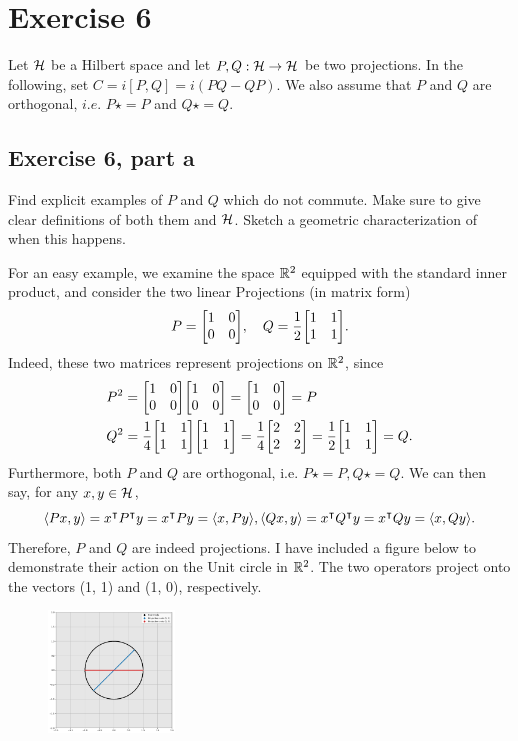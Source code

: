 \newpage
\section{Exercise 6}
Let $\mathcal{H}$ be a Hilbert space and let $P, Q: \mathcal{H} \to \mathcal{H}$ be two projections. In the following, set $C = i[P, Q] = i(PQ - QP)$. We also assume that $P$ and $Q$ are orthogonal, $i.e.$ $P\star = P$ and $Q\star = Q$.
\subsection{Exercise 6, part a}
Find explicit examples of $P$ and $Q$ which do not commute. Make sure to give clear definitions of both them and $\mathcal{H}$. Sketch a geometric characterization of when this happens. 
\partbreak
\begin{solution}

    For an easy example, we examine the space $\mathbb{R}^2$ equipped with the standard inner product, and consider the two linear Projections (in matrix form)
    \[P = \mqty[1&0\\0&0], \quad Q = \frac{1}{2}\mqty[1&1\\1&1].\]
    Indeed, these two matrices represent projections on $\mathbb{R}^2$, since 
    \begin{align*}
        &P^2 = \mqty[1&0\\0&0]\mqty[1&0\\0&0] = \mqty[1&0\\0&0] = P\\
        &Q^2 = \frac{1}{4}\mqty[1&1\\1&1]\mqty[1&1\\1&1] = \frac{1}{4}\mqty[2&2\\2&2] = \frac{1}{2}\mqty[1&1\\1&1] = Q.
    \end{align*}
    Furthermore, both $P$ and $Q$ are orthogonal, i.e. $P\star = P, Q\star = Q$. We can then say, for any $x, y \in \mathcal{H}$, 
    \[\langle Px, y \rangle = x^{\intercal} P^{\intercal} y = x^{\intercal} P y = \langle x, Py \rangle, \langle Qx, y \rangle = x^{\intercal} Q^{\intercal} y = x^{\intercal} Q y = \langle x, Qy \rangle.\]
    Therefore, $P$ and $Q$ are indeed projections. I have included a figure below to demonstrate their action on the Unit circle in $\mathbb{R}^2$. The two operators project onto the vectors (1, 1) and (1, 0), respectively.
\end{solution}
\vspace{3mm}
\begin{figure}[!h]
    \centering
    \includegraphics[width = 0.3\textwidth]{Figures/P and Q.png}
\end{figure}

